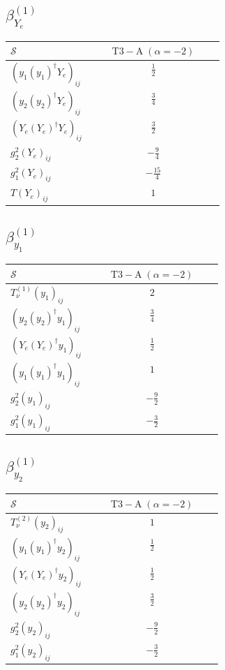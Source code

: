 \documentclass[9pt]{article}
\begin{document}
\subsection*{$ \beta_{Y_e}^{(1)} $}
\begin{longtable}{@{}p{0.38\linewidth}c@{}}
\toprule
$\mathcal{S}$ & $ \mathrm{T3-A}\;(\alpha=-2) $ \\
\midrule
$ (y_1 (y_1)^{\dagger} Y_e)_{ij} $ & $ \frac{1}{2} $ \\
$ (y_2 (y_2)^{\dagger} Y_e)_{ij} $ & $ \frac{3}{4} $ \\
$ (Y_e (Y_e)^{\dagger} Y_e)_{ij} $ & $ \frac{3}{2} $ \\
$ g_2^2 (Y_e)_{ij} $ & $ - \frac{9}{4} $ \\
$ g_1^2 (Y_e)_{ij} $ & $ - \frac{15}{4} $ \\
$ T (Y_e)_{ij} $ & $ 1 $ \\
\bottomrule
\end{longtable}
\subsection*{$ \beta_{y_1}^{(1)} $}
\begin{longtable}{@{}p{0.38\linewidth}c@{}}
\toprule
$\mathcal{S}$ & $ \mathrm{T3-A}\;(\alpha=-2) $ \\
\midrule
$ T_{\nu}^{(1)} (y_1)_{ij} $ & $ 2 $ \\
$ (y_2 (y_2)^{\dagger} y_1)_{ij} $ & $ \frac{3}{4} $ \\
$ (Y_e (Y_e)^{\dagger} y_1)_{ij} $ & $ \frac{1}{2} $ \\
$ (y_1 (y_1)^{\dagger} y_1)_{ij} $ & $ 1 $ \\
$ g_2^2 (y_1)_{ij} $ & $ - \frac{9}{2} $ \\
$ g_1^2 (y_1)_{ij} $ & $ - \frac{3}{2} $ \\
\bottomrule
\end{longtable}
\subsection*{$ \beta_{y_2}^{(1)} $}
\begin{longtable}{@{}p{0.38\linewidth}c@{}}
\toprule
$\mathcal{S}$ & $ \mathrm{T3-A}\;(\alpha=-2) $ \\
\midrule
$ T_{\nu}^{(2)} (y_2)_{ij} $ & $ 1 $ \\
$ (y_1 (y_1)^{\dagger} y_2)_{ij} $ & $ \frac{1}{2} $ \\
$ (Y_e (Y_e)^{\dagger} y_2)_{ij} $ & $ \frac{1}{2} $ \\
$ (y_2 (y_2)^{\dagger} y_2)_{ij} $ & $ \frac{3}{2} $ \\
$ g_2^2 (y_2)_{ij} $ & $ - \frac{9}{2} $ \\
$ g_1^2 (y_2)_{ij} $ & $ - \frac{3}{2} $ \\
\bottomrule
\end{longtable}
\end{document}
